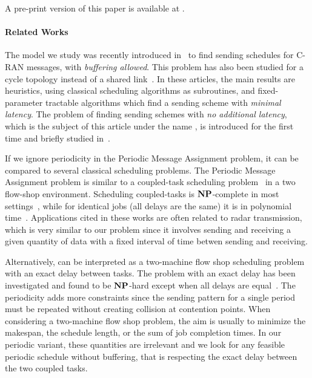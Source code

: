 \documentclass[pdflatex,sn-mathphys,iicol]{sn-jnl}%
\theoremstyle{thmstyleone}%
\theoremstyle{thmstyletwo}%
\theoremstyle{thmstylethree}%
\begin{document}
A pre-print version of this paper is available at \cite{DBLP:journals/corr/abs-2002-07606}.


\paragraph*{Related Works}

The model we study was recently introduced in~\cite{barth2018deterministic,guiraud2021deterministic} to find sending schedules for C-RAN messages, with \emph{buffering allowed}. This problem has also been studied for a cycle topology instead of a shared link~\cite{Guir1905:Deterministic}. In these articles, the main results are heuristics, using classical scheduling algorithms as subroutines, and fixed-parameter tractable algorithms which find a sending scheme with \emph{minimal latency}. The problem of finding sending schemes with \emph{no additional latency}, which is the subject of this article under the name \pma, is introduced for the first time and briefly studied in~\cite{bartharxiv2018deterministic}.


If we ignore periodicity in the Periodic Message Assignment problem, it can be compared to several classical scheduling problems. The Periodic Message Assignment problem is similar to a coupled-task scheduling problem~\cite{shapiro1980scheduling,khatami2020coupled,chen2021scheduling} in a two flow-shop environment. Scheduling coupled-tasks is $\textbf{NP}$-complete in most settings~\cite{orman1997complexity}, while for identical jobs (all delays are the same) it is in polynomial time~\cite{baptiste2010note}. Applications cited in these works are often related to radar transmission, which is very similar to our problem since it involves sending and receiving a given quantity of data with a fixed interval of time betwen sending and receiving. 


Alternatively, \pma can be interpreted as a two-machine flow shop scheduling problem~\cite{khatami2023flow,zhao2020two,johnson1954optimal,yu2004minimizing} with an exact delay between tasks. The problem with an exact delay has been investigated and found to be $\textbf{NP}$-hard except when all delays are equal~\cite{leung2007scheduling}. The periodicity adds more constraints since the sending pattern for a single period must be repeated without creating collision at contention points. When considering a two-machine flow shop problem, the aim is usually to minimize the makespan, the schedule length, or the sum of job completion times. In our periodic variant, these quantities are irrelevant and we look for any feasible periodic schedule without buffering, that is respecting the exact delay between the two coupled tasks.
\end{document}
